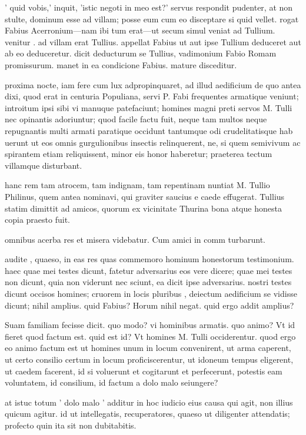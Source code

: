  ' quid vobis,' inquit, 'istic negoti in meo est?' servus respondit pudenter, at non stulte, dominum esse ad villam; posse eum cum eo disceptare si quid vellet. rogat Fabius Acerronium—nam ibi tum erat—ut secum simul veniat ad Tullium. venitur . ad villam erat Tullius. appellat Fabius ut aut ipse Tullium deduceret aut ab eo deduceretur. dicit deducturum se Tullius, vadimonium Fabio Romam promissurum. manet in ea condicione Fabius. mature disceditur.

 proxima nocte, iam fere cum lux adpropinquaret, ad illud aedificium de quo antea dixi, quod erat in centuria Populiana, servi P. Fabi frequentes armatique veniunt; introitum ipsi sibi vi manuque patefaciunt; homines magni preti servos M. Tulli nec opinantis adoriuntur; quod facile factu fuit, neque tam multos neque repugnantis multi armati paratique occidunt tantumque odi crudelitatisque hab uerunt ut eos omnis gurgulionibus insectis relinquerent, ne, si quem semivivum ac spirantem etiam reliquissent, minor eis honor haberetur; praeterea tectum villamque disturbant.

 hanc rem tam atrocem, tam indignam, tam repentinam nuntiat M. Tullio Philinus, quem antea nominavi, qui graviter saucius e caede effugerat. Tullius statim dimittit ad amicos, quorum ex vicinitate Thurina bona atque honesta copia praesto fuit.

 omnibus acerba res et misera videbatur. Cum amici in comm turbarunt.

 audite , quaeso, in eas res quas commemoro hominum honestorum testimonium. haec quae mei testes dicunt, fatetur adversarius eos vere dicere; quae mei testes non dicunt, quia non viderunt nec sciunt, ea dicit ipse adversarius. nostri testes dicunt occisos homines; cruorem in locis pluribus , deiectum aedificium se vidisse dicunt; nihil amplius. quid Fabius? Horum nihil negat. quid ergo addit amplius?

 Suam familiam fecisse dicit. quo modo? vi hominibus armatis. quo animo? Vt id fieret quod factum est. quid est id? Vt homines M. Tulli occiderentur. quod ergo eo animo factum est ut homines unum in locum convenirent, ut arma caperent, ut certo consilio certum in locum proficiscerentur, ut idoneum tempus eligerent, ut caedem facerent, id si voluerunt et cogitarunt et perfecerunt, potestis eam voluntatem, id consilium, id factum a dolo malo seiungere?

 at istuc totum ' dolo malo ' additur in hoc iudicio eius causa qui agit, non illius quicum agitur. id ut intellegatis, recuperatores, quaeso ut diligenter attendatis; profecto quin ita sit non dubitabitis.

